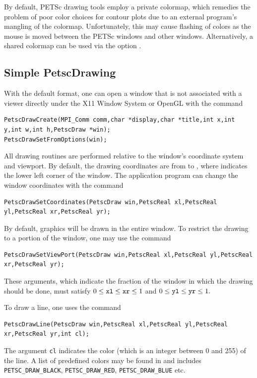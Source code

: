 {{\medskip
By default, PETSc drawing tools employ a private colormap,
which remedies the problem of poor color choices for contour plots due
to an external program's mangling of the colormap.
Unfortunately, this may cause flashing of colors as the mouse is moved
between the PETSc windows and other windows.  Alternatively, a shared
colormap can be used via the option .

\subsection{Simple PetscDrawing}

With the default format, one can open a window that is not associated with a viewer directly
under the X11 Window System or OpenGL with the
command  
\begin{lstlisting}
PetscDrawCreate(MPI_Comm comm,char *display,char *title,int x,int y,int w,int h,PetscDraw *win);
PetscDrawSetFromOptions(win);
\end{lstlisting}
All drawing routines are performed relative to the window's coordinate system
and viewport. By default, the drawing coordinates are from  to
, where  indicates the lower left corner of the
window. The application program can change the window coordinates with the
command  
\begin{lstlisting}
PetscDrawSetCoordinates(PetscDraw win,PetscReal xl,PetscReal yl,PetscReal xr,PetscReal yr);
\end{lstlisting}
By default, graphics will be drawn in the entire window. To restrict the
drawing to a portion of the window, one may
use the command
\begin{lstlisting}
PetscDrawSetViewPort(PetscDraw win,PetscReal xl,PetscReal yl,PetscReal xr,PetscReal yr);
\end{lstlisting}
These arguments, which indicate the fraction of the window in which the
drawing should be done, must satisfy
$ 0 \leq {\tt xl} \leq {\tt xr} \leq 1 $ and $ 0 \leq {\tt yl} \leq {\tt yr} \leq 1.$

To draw a line, one uses
 the command 
\begin{lstlisting}
PetscDrawLine(PetscDraw win,PetscReal xl,PetscReal yl,PetscReal xr,PetscReal yr,int cl);
\end{lstlisting}
The argument \lstinline{cl} indicates the color (which is an integer between 0 and 255)
of the line. A list of predefined colors may be found in 
and includes \lstinline{PETSC_DRAW_BLACK}, \lstinline{PETSC_DRAW_RED}, \lstinline{PETSC_DRAW_BLUE} etc.

}}
